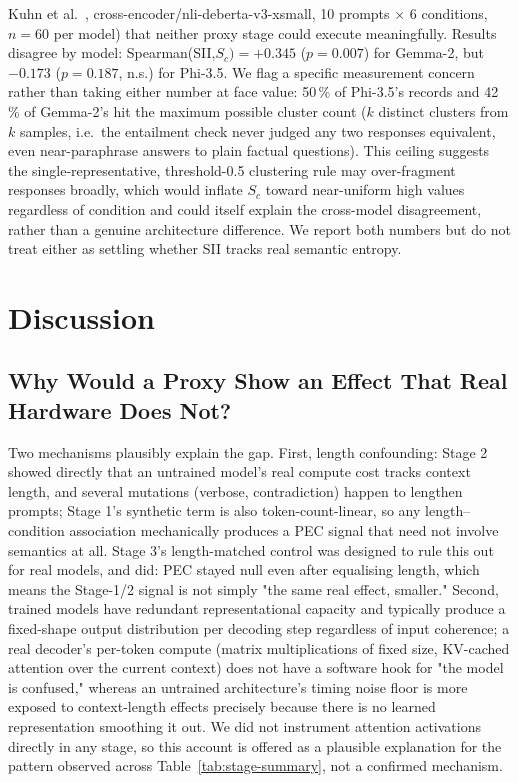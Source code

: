 \documentclass[conference]{IEEEtran}
\begin{document}
Kuhn et al.~\cite{kuhn2023semantic}, cross-encoder/nli-deberta-v3-xsmall,
10 prompts $\times$ 6 conditions, $n=60$ per model) that neither
proxy stage could execute meaningfully. Results disagree by model:
Spearman(SII,$S_c)=+0.345$ ($p=0.007$) for Gemma-2, but
$-0.173$ ($p=0.187$, n.s.) for Phi-3.5. We flag a specific measurement
concern rather than taking either number at face value: 50\,\% of
Phi-3.5's records and 42\,\% of Gemma-2's hit the maximum possible
cluster count ($k$ distinct clusters from $k$ samples, i.e.\ the
entailment check never judged any two responses equivalent, even
near-paraphrase answers to plain factual questions). This ceiling
suggests the single-representative, threshold-0.5 clustering rule may
over-fragment responses broadly, which would inflate $S_c$ toward
near-uniform high values regardless of condition and could itself
explain the cross-model disagreement, rather than a genuine
architecture difference. We report both numbers but do not treat
either as settling whether SII tracks real semantic entropy.
\section{Discussion}
\label{sec:discussion}
\subsection{Why Would a Proxy Show an Effect That Real Hardware Does Not?}
Two mechanisms plausibly explain the gap. First, length confounding:
Stage 2 showed directly that an untrained model's real compute cost
tracks context length, and several mutations (verbose, contradiction)
happen to lengthen prompts; Stage 1's synthetic term is also
token-count-linear, so any length--condition association mechanically
produces a PEC signal that need not involve semantics at all. Stage
3's length-matched control was designed to rule this out for real
models, and did: PEC stayed null even after equalising length, which
means the Stage-1/2 signal is not simply "the same real effect,
smaller." Second, trained models have redundant representational
capacity and typically produce a fixed-shape output distribution per
decoding step regardless of input coherence; a real decoder's
per-token compute (matrix multiplications of fixed size, KV-cached
attention over the current context) does not have a software hook for
"the model is confused," whereas an untrained architecture's timing
noise floor is more exposed to context-length effects precisely
because there is no learned representation smoothing it out. We did
not instrument attention activations directly in any stage, so this
account is offered as a plausible explanation for the pattern
observed across Table~\ref{tab:stage-summary}, not a confirmed
mechanism.
\end{document}
